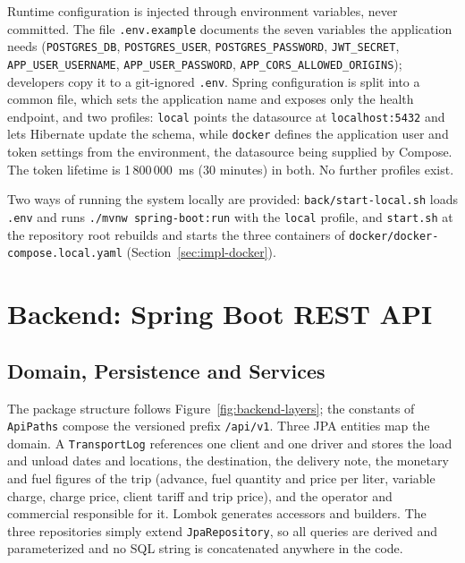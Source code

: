 Runtime configuration is injected through environment variables, never committed. The file \texttt{.env.example} documents the seven variables the application needs (\texttt{POSTGRES\_DB}, \texttt{POSTGRES\_USER}, \texttt{POSTGRES\_PASSWORD}, \texttt{JWT\_SECRET}, \texttt{APP\_USER\_USERNAME}, \texttt{APP\_USER\_PASSWORD}, \texttt{APP\_CORS\_ALLOWED\_ORIGINS}); developers copy it to a git-ignored \texttt{.env}. Spring configuration is split into a common file, which sets the application name and exposes only the health endpoint, and two profiles: \texttt{local} points the datasource at \texttt{localhost:5432} and lets Hibernate update the schema, while \texttt{docker} defines the application user and token settings from the environment, the datasource being supplied by Compose. The token lifetime is 1\,800\,000~ms (30 minutes) in both. No further profiles exist.

Two ways of running the system locally are provided: \texttt{back/start-local.sh} loads \texttt{.env} and runs \texttt{./mvnw spring-boot:run} with the \texttt{local} profile, and \texttt{start.sh} at the repository root rebuilds and starts the three containers of \texttt{docker/docker-compose.local.yaml} (Section~\ref{sec:impl-docker}).

\section{Backend: Spring Boot REST API}
\label{sec:impl-back}

\subsection{Domain, Persistence and Services}

The package structure follows Figure~\ref{fig:backend-layers}; the constants of \texttt{ApiPaths} compose the versioned prefix \texttt{/api/v1}. Three JPA entities map the domain. A \texttt{TransportLog} references one client and one driver and stores the load and unload dates and locations, the destination, the delivery note, the monetary and fuel figures of the trip (advance, fuel quantity and price per liter, variable charge, charge price, client tariff and trip price), and the operator and commercial responsible for it. Lombok generates accessors and builders. The three repositories simply extend \texttt{JpaRepository}, so all queries are derived and parameterized and no SQL string is concatenated anywhere in the code.

